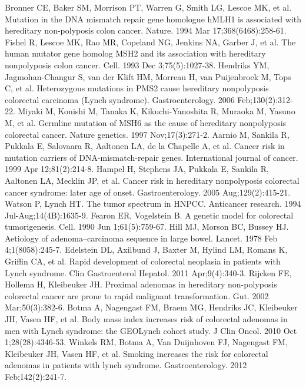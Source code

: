 \begin{thebibliography}{12} 
		Bronner CE, Baker SM, Morrison PT, Warren G, Smith LG, Lescoe MK, et al. Mutation in the DNA mismatch repair gene homologue hMLH1 is associated with hereditary non-polyposis colon cancer. Nature. 1994 Mar 17;368(6468):258-61. 
		Fishel R, Lescoe MK, Rao MR, Copeland NG, Jenkins NA, Garber J, et al. The human mutator gene homolog MSH2 and its association with hereditary nonpolyposis colon cancer. Cell. 1993 Dec 3;75(5):1027-38. 
		Hendriks YM, Jagmohan-Changur S, van der Klift HM, Morreau H, van Puijenbroek M, Tops C, et al. Heterozygous mutations in PMS2 cause hereditary nonpolyposis colorectal carcinoma (Lynch syndrome). Gastroenterology. 2006 Feb;130(2):312-22. 
		Miyaki M, Konishi M, Tanaka K, Kikuchi-Yanoshita R, Muraoka M, Yasuno M, et al. Germline mutation of MSH6 as the cause of hereditary nonpolyposis colorectal cancer. Nature genetics. 1997 Nov;17(3):271-2. 
		Aarnio M, Sankila R, Pukkala E, Salovaara R, Aaltonen LA, de la Chapelle A, et al. Cancer risk in mutation carriers of DNA-mismatch-repair genes. International journal of cancer. 1999 Apr 12;81(2):214-8. 
		Hampel H, Stephens JA, Pukkala E, Sankila R, Aaltonen LA, Mecklin JP, et al. Cancer risk in hereditary nonpolyposis colorectal cancer syndrome: later age of onset. Gastroenterology. 2005 Aug;129(2):415-21. 
		Watson P, Lynch HT. The tumor spectrum in HNPCC. Anticancer research. 1994 Jul-Aug;14(4B):1635-9. 
		Fearon ER, Vogelstein B. A genetic model for colorectal tumorigenesis. Cell. 1990 Jun 1;61(5):759-67. 
		Hill MJ, Morson BC, Bussey HJ. Aetiology of adenoma--carcinoma sequence in large bowel. Lancet. 1978 Feb 4;1(8058):245-7. 
		Edelstein DL, Axilbund J, Baxter M, Hylind LM, Romans K, Griffin CA, et al. Rapid development of colorectal neoplasia in patients with Lynch syndrome. Clin Gastroenterol Hepatol. 2011 Apr;9(4):340-3. 
		Rijcken FE, Hollema H, Kleibeuker JH. Proximal adenomas in hereditary non-polyposis colorectal cancer are prone to rapid malignant transformation. Gut. 2002 Mar;50(3):382-6. 
		Botma A, Nagengast FM, Braem MG, Hendriks JC, Kleibeuker JH, Vasen HF, et al. Body mass index increases risk of colorectal adenomas in men with Lynch syndrome: the GEOLynch cohort study. J Clin Oncol. 2010 Oct 1;28(28):4346-53. 
		Winkels RM, Botma A, Van Duijnhoven FJ, Nagengast FM, Kleibeuker JH, Vasen HF, et al. Smoking increases the risk for colorectal adenomas in patients with lynch syndrome. Gastroenterology. 2012 Feb;142(2):241-7. 

\end{thebibliography}
